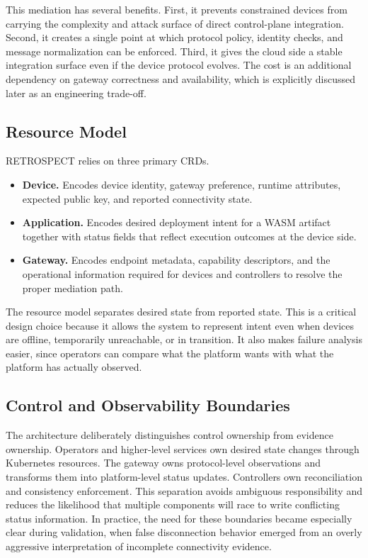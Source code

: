This mediation has several benefits. First, it prevents constrained devices from carrying the complexity and attack surface of direct control-plane integration. Second, it creates a single point at which protocol policy, identity checks, and message normalization can be enforced. Third, it gives the cloud side a stable integration surface even if the device protocol evolves. The cost is an additional dependency on gateway correctness and availability, which is explicitly discussed later as an engineering trade-off.

\subsection{Resource Model}
RETROSPECT relies on three primary CRDs.
\begin{itemize}
    \item \textbf{Device.} Encodes device identity, gateway preference, runtime attributes, expected public key, and reported connectivity state.
    \item \textbf{Application.} Encodes desired deployment intent for a WASM artifact together with status fields that reflect execution outcomes at the device side.
    \item \textbf{Gateway.} Encodes endpoint metadata, capability descriptors, and the operational information required for devices and controllers to resolve the proper mediation path.
\end{itemize}

The resource model separates desired state from reported state. This is a critical design choice because it allows the system to represent intent even when devices are offline, temporarily unreachable, or in transition. It also makes failure analysis easier, since operators can compare what the platform wants with what the platform has actually observed.

\subsection{Control and Observability Boundaries}
The architecture deliberately distinguishes control ownership from evidence ownership. Operators and higher-level services own desired state changes through Kubernetes resources. The gateway owns protocol-level observations and transforms them into platform-level status updates. Controllers own reconciliation and consistency enforcement. This separation avoids ambiguous responsibility and reduces the likelihood that multiple components will race to write conflicting status information. In practice, the need for these boundaries became especially clear during validation, when false disconnection behavior emerged from an overly aggressive interpretation of incomplete connectivity evidence.
